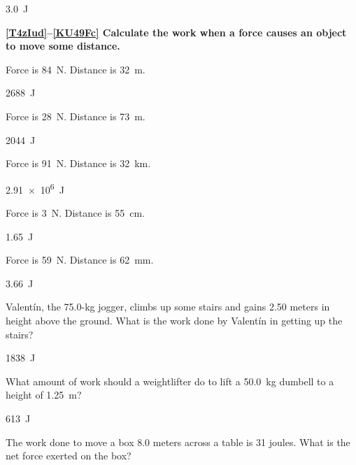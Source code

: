 \documentclass[../main-physics-problems.tex]{subfiles}
\begin{document}
\begin{questions}
\begin{solution}
\SI{3.0}{J}
\end{solution}


\vspace{1em}

\textbf{\ref{T4zIud}--\ref{KU49Fc} Calculate the work when a force causes an object to move some distance.}

\question \label{T4zIud}
Force is \SI{84}{N}. Distance is \SI{32}{m}.

\begin{solution}
\SI{2688}{J}
\end{solution}

\question \label{mroTSQ}
Force is \SI{28}{N}. Distance is \SI{73}{m}.

\begin{solution}
\SI{2044}{J}
\end{solution}


\question \label{1KDZL2}
Force is \SI{91}{N}. Distance is \SI{32}{km}.

\begin{solution}
\SI{2.91e6}{J}
\end{solution}


\question \label{masH3z}
Force is \SI{3}{N}. Distance is \SI{55}{cm}.

\begin{solution}
\SI{1.65}{J}
\end{solution}


\question \label{KU49Fc}
Force is \SI{59}{N}. Distance is \SI{62}{mm}.

\begin{solution}
\SI{3.66}{J}
\end{solution}


\question \label{VMEVDL}
Valent\'{i}n, the 75.0-kg jogger, climbs up some stairs and gains 2.50 meters in height above the ground. What is the work done by Valent\'{i}n in getting up the stairs? 

\begin{solution}
\SI{1838}{J}
\end{solution}


\question \label{OgbvKL}
What amount of work should a weightlifter do to lift a \SI{50.0}{kg} dumbell to a height of \SI{1.25}{m}?

\begin{solution}
\SI{613}{J}
\end{solution}

\question \label{T8C3X0}
The work done to move a box 8.0 meters across a table is 31 joules. What is the net force exerted on the box?


\end{questions}
\end{document}
